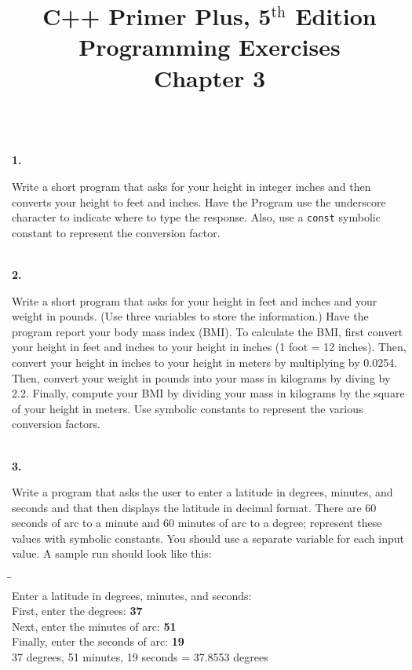 \documentclass[10 pt]{amsart}
\newlength{\cwidth}
\newenvironment{cpart}[2][\cwidth]
	{\\ \phantom{\qquad}\textbf{#2. }\begin{minipage}[t]{#1}}
	{\end{minipage}}
\newcommand{\ChapNum}{3}
\begin{document}
	\title
	[Chapter \ChapNum]
	{C++ Primer Plus, 5$^\text{th}$ Edition \\
	Programming Exercises \\
	Chapter \ChapNum}

	\maketitle

	\begin{cpart}{1}
		Write a short program that asks for your height in integer inches 
		and then converts your height to feet and inches. 
		Have the Program use the underscore character to indicate where 
		to type the response. Also, use a \texttt{const} symbolic 
		constant to represent the conversion factor.
	\end{cpart}
	\vspace{2ex}

	\begin{cpart}{2}
		Write a short program that asks for your height in feet and inches
		and your weight in pounds.
		(Use three variables to store the information.)
		Have the program report your body mass index (BMI).
		To calculate the BMI, first convert your height in feet and
		inches to your height in inches (1 foot = 12 inches). 
		Then, convert your height in inches to your height in meters by
		multiplying by 0.0254. 
		Then, convert your weight in pounds into your mass in 
		kilograms by diving by 2.2. 
		Finally, compute your BMI by dividing your mass in kilograms by
		the square of your height in meters. 
		Use symbolic constants to represent the various conversion factors.
	\end{cpart}
	\vspace{2ex}

	\begin{cpart}{3}
		Write a program that asks the user to enter a latitude in degrees,
		minutes, and seconds and that then displays the latitude in
		decimal format.
		There are 60 seconds of arc to a minute and 60 minutes of arc
		to a degree;
		represent these values with symbolic constants.
		You should use a separate variable for each input value.
		A sample run should look like this:
		{\ttfamily
			\begin{tabbing}
				\phantom{\qquad}\=\phantom{\qquad}\=\phantom{\qquad}\= \\
				Enter a latitude in degrees, minutes, and 
					seconds: \\
				First, enter the degrees: {\bf 37} \\
				Next, enter the minutes of arc: {\bf 51} \\
				Finally, enter the seconds of arc: {\bf 19} \\
				37 degrees, 51 minutes, 19 seconds = 37.8553 degrees
			\end{tabbing}
		}
	\end{cpart}
	\vspace{2ex}
\end{document}

